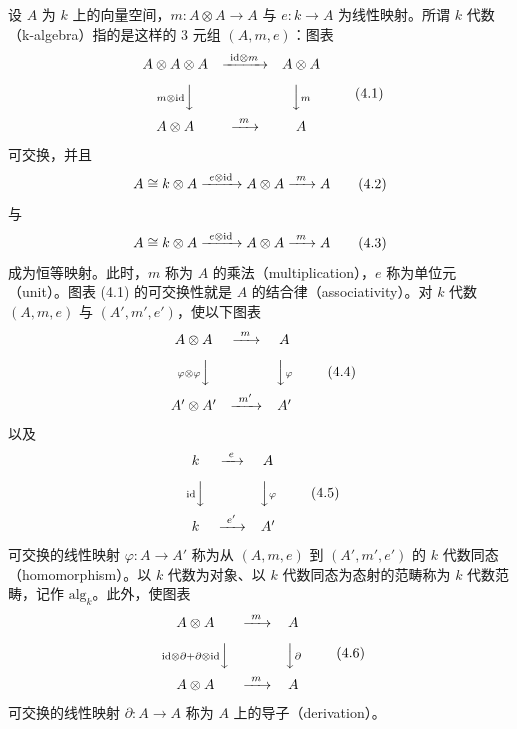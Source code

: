设 $A$ 为 $k$ 上的向量空间，$m\colon A\otimes A\to A$ 与 $e\colon k\to A$ 为线性映射。所谓 $k$ 代数（k-algebra）指的是这样的 3 元组 $(A,m,e)$：图表
\begin{equation}
  \begin{array}{ccc}
    A\otimes A\otimes A & \xrightarrow{\ \mathrm{id}\otimes m\ } & A\otimes A\\[8pt]
    {\scriptstyle m\otimes\mathrm{id}}\Big\downarrow & & \Big\downarrow{\scriptstyle m}\\[8pt]
    A\otimes A & \xrightarrow{\ m\ } & A
  \end{array} \tag{4.1}
\end{equation}
可交换，并且
\begin{equation}
  A\cong k\otimes A \xrightarrow{\ e\otimes\mathrm{id}\ } A\otimes A \xrightarrow{\ m\ } A \tag{4.2}
\end{equation}
与
\begin{equation}
  A\cong k\otimes A \xrightarrow{\ e\otimes\mathrm{id}\ } A\otimes A \xrightarrow{\ m\ } A \tag{4.3}
\end{equation}
成为恒等映射。此时，$m$ 称为 $A$ 的乘法（multiplication），$e$ 称为单位元（unit）。图表 (4.1) 的可交换性就是 $A$ 的结合律（associativity）。对 $k$ 代数 $(A,m,e)$ 与 $(A',m',e')$，使以下图表
\begin{equation}
  \begin{array}{ccc}
    A\otimes A & \xrightarrow{\ m\ } & A\\[8pt]
    {\scriptstyle\varphi\otimes\varphi}\Big\downarrow & & \Big\downarrow{\scriptstyle\varphi}\\[8pt]
    A'\otimes A' & \xrightarrow{\ m'\ } & A'
  \end{array} \tag{4.4}
\end{equation}
以及
\begin{equation}
  \begin{array}{ccc}
    k & \xrightarrow{\ e\ } & A\\[8pt]
    {\scriptstyle\mathrm{id}}\Big\downarrow & & \Big\downarrow{\scriptstyle\varphi}\\[8pt]
    k & \xrightarrow{\ e'\ } & A'
  \end{array} \tag{4.5}
\end{equation}
可交换的线性映射 $\varphi\colon A\to A'$ 称为从 $(A,m,e)$ 到 $(A',m',e')$ 的 $k$ 代数同态（homomorphism）。以 $k$ 代数为对象、以 $k$ 代数同态为态射的范畴称为 $k$ 代数范畴，记作 $\mathrm{alg}_k$。此外，使图表
\begin{equation}
  \begin{array}{ccc}
    A\otimes A & \xrightarrow{\ m\ } & A\\[8pt]
    {\scriptstyle\mathrm{id}\otimes\partial+\partial\otimes\mathrm{id}}\Big\downarrow & & \Big\downarrow{\scriptstyle\partial}\\[8pt]
    A\otimes A & \xrightarrow{\ m\ } & A
  \end{array} \tag{4.6}
\end{equation}
可交换的线性映射 $\partial\colon A\to A$ 称为 $A$ 上的导子（derivation）。

